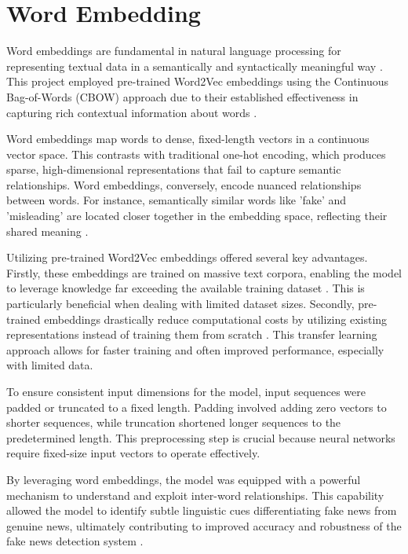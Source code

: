 \documentclass[sn-mathphys-ay, Numbered]{sn-jnl}
\theoremstyle{thmstyleone}%
\theoremstyle{thmstyletwo}%
\theoremstyle{thmstylethree}%
\begin{document}
\section{Word Embedding}
Word embeddings are fundamental in natural language processing for representing textual data in a semantically and syntactically meaningful way \citep{embeddingsClose, Jurafsky2019Speech}. This project employed pre-trained Word2Vec embeddings using the Continuous Bag-of-Words (CBOW) approach due to their established effectiveness in capturing rich contextual information about words \citep{word2VecEfficient}.

Word embeddings map words to dense, fixed-length vectors in a continuous vector space. This contrasts with traditional one-hot encoding, which produces sparse, high-dimensional representations that fail to capture semantic relationships. Word embeddings, conversely, encode nuanced relationships between words. For instance, semantically similar words like 'fake' and 'misleading' are located closer together in the embedding space, reflecting their shared meaning \citep{embeddingsClose}.

Utilizing pre-trained Word2Vec embeddings offered several key advantages. Firstly, these embeddings are trained on massive text corpora, enabling the model to leverage knowledge far exceeding the available training dataset \citep{levy-etal-2015-improving}. This is particularly beneficial when dealing with limited dataset sizes. Secondly, pre-trained embeddings drastically reduce computational costs by utilizing existing representations instead of training them from scratch \citep{PreTrainEmb}. This transfer learning approach allows for faster training and often improved performance, especially with limited data.

To ensure consistent input dimensions for the model, input sequences were padded or truncated to a fixed length. Padding involved adding zero vectors to shorter sequences, while truncation shortened longer sequences to the predetermined length. This preprocessing step is crucial because neural networks require fixed-size input vectors to operate effectively.

By leveraging word embeddings, the model was equipped with a powerful mechanism to understand and exploit inter-word relationships. This capability allowed the model to identify subtle linguistic cues differentiating fake news from genuine news, ultimately contributing to improved accuracy and robustness of the fake news detection system \citep{rashkin-etal-2017-truth}.
\end{document}
